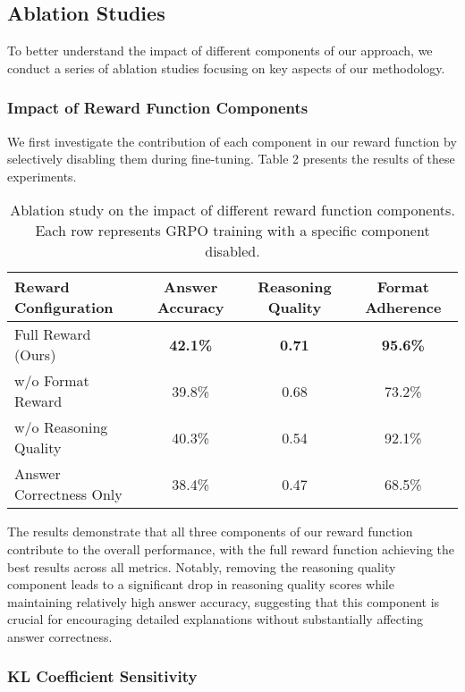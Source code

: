 \documentclass[11pt,a4paper]{article}
\begin{document}
\subsection{Ablation Studies}

To better understand the impact of different components of our approach, we conduct a series of ablation studies focusing on key aspects of our methodology.

\subsubsection{Impact of Reward Function Components}

We first investigate the contribution of each component in our reward function by selectively disabling them during fine-tuning. Table 2 presents the results of these experiments.

\begin{table}[h]
\centering
\begin{tabular}{lccc}
\toprule
\textbf{Reward Configuration} & \textbf{Answer Accuracy} & \textbf{Reasoning Quality} & \textbf{Format Adherence} \\
\midrule
Full Reward (Ours) & \textbf{42.1\%} & \textbf{0.71} & \textbf{95.6\%} \\
w/o Format Reward & 39.8\% & 0.68 & 73.2\% \\
w/o Reasoning Quality & 40.3\% & 0.54 & 92.1\% \\
Answer Correctness Only & 38.4\% & 0.47 & 68.5\% \\
\bottomrule
\end{tabular}
\caption{Ablation study on the impact of different reward function components. Each row represents GRPO training with a specific component disabled.}
\label{tab:reward_ablation}
\end{table}

The results demonstrate that all three components of our reward function contribute to the overall performance, with the full reward function achieving the best results across all metrics. Notably, removing the reasoning quality component leads to a significant drop in reasoning quality scores while maintaining relatively high answer accuracy, suggesting that this component is crucial for encouraging detailed explanations without substantially affecting answer correctness.

\subsubsection{KL Coefficient Sensitivity}
\end{document}
